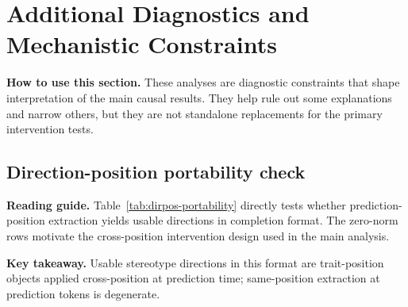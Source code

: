 \section{Additional Diagnostics and Mechanistic Constraints}
\noindent\textbf{How to use this section.} These analyses are diagnostic constraints that shape interpretation of the main causal results. They help rule out some explanations and narrow others, but they are not standalone replacements for the primary intervention tests.
\subsection{Direction-position portability check}
\noindent\textbf{Reading guide.} Table~\ref{tab:dirpos-portability} directly tests whether prediction-position extraction yields usable directions in completion format. The zero-norm rows motivate the cross-position intervention design used in the main analysis.
\begin{table}[H]
\centering
\footnotesize
\setlength{\tabcolsep}{3pt}
\caption{Prediction-position direction portability check. In completion format, train-split stereotype/anti contexts are identical at prediction position, so extracted prediction-position directions collapse to zero and causal deltas vanish.}
\label{tab:dirpos-portability}
\end{table}
\noindent\textbf{Key takeaway.} Usable stereotype directions in this format are trait-position objects applied cross-position at prediction time; same-position extraction at prediction tokens is degenerate.

